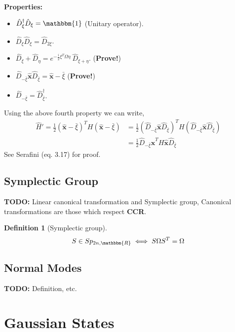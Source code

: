 \documentclass[english,10pt,a4paper]{article}
\newtheorem{definition}{Definition}
\newcommand{\xx}{\hat{\textbf{x}}}
\newcommand{\dd}[1]{\hat{D}_{#1}}
\newcommand{\half}{\frac{1}{2}}
\begin{document}
	\textbf{Properties:}	\begin{itemize}
		\item $\dd{\xi}^\dagger \dd{\xi} = \mathbbm{1}$ (Unitary operator).
		\item $\dd{\xi}\dd{\xi}=\dd{2\xi}$.
		\item $\dd{\xi}+\dd{\eta} = e^{-\frac{i}{2}\xi^T\Omega \eta}\ \dd{\xi+\eta}$. (\textbf{Prove!})
		\item$\dd{-\bar{\xi}} \xx \dd{\bar{\xi}} = \xx - \bar{\xi}$ (\textbf{Prove!})
		\item $\dd{-\bar{\xi}} = \dd{\bar{\xi}}^\dagger$.
	\end{itemize}
	Using the above fourth property we can write,
	\begin{align}
		\hat{H}' = \half (\xx-\bar{\xi})^T H (\xx-\bar{\xi}) &= \half (\dd{-\bar{\xi}} \xx \dd{\bar{\xi}})^T H (\dd{-\bar{\xi}} \xx \dd{\bar{\xi}}) \\ &= \half \dd{-\bar{\xi}} \xx^T H \xx \dd{\bar{\xi}}
	\end{align} See Serafini (eq. 3.17) for proof.
	
	
	\subsection{Symplectic Group}
	\textbf{TODO:} Linear canonical transformation and Symplectic group, Canonical transformations are those which respect  \textbf{CCR}.
	\begin{definition}
		[Symplectic group]
		\begin{equation}
			S\in Sp_{2n,\mathbbm{R}} \iff S\Omega S^T=\Omega
		\end{equation}
	\end{definition}
	
	\subsection{Normal Modes}
	\textbf{TODO: }Definition, etc.
	
	\section{Gaussian States}
	
\end{document}
